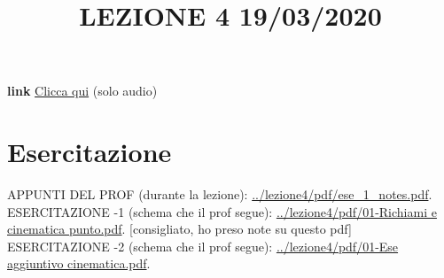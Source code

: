 \title{LEZIONE 4 19/03/2020}\newline
\textbf{link} \href{https://web.microsoftstream.com/video/4f8d8d0e-8354-4151-bbc2-efa8e7399119?list=user&userId=c487c446-28dc-44c3-b1fb-2fe7e71e0737}{Clicca qui} (solo audio)
\section*{Esercitazione}
APPUNTI DEL PROF (durante la lezione): \url{../lezione4/pdf/ese_1_notes.pdf}.\newline
\newline
ESERCITAZIONE -1 (schema che il prof segue): \url{../lezione4/pdf/01-Richiami e cinematica punto.pdf}. [consigliato, ho preso note su questo pdf]\newline
\newline
ESERCITAZIONE -2 (schema che il prof segue): \url{../lezione4/pdf/01-Ese aggiuntivo cinematica.pdf}.